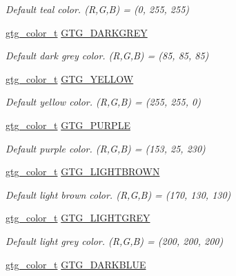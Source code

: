 \begin{DoxyCompactItemize}
\begin{DoxyCompactList}\small\item\em Default teal color. (R,G,B) = (0, 255, 255) \end{DoxyCompactList}\item 
\hyperlink{GTGColor_8h_a7d118edf2d6e2588a0323079259fb0d6}{gtg\-\_\-color\-\_\-t} \hyperlink{group__GTGColor_ga088b63848f60b294eb7717f9160ce76a}{G\-T\-G\-\_\-\-D\-A\-R\-K\-G\-R\-E\-Y}
\begin{DoxyCompactList}\small\item\em Default dark grey color. (R,G,B) = (85, 85, 85) \end{DoxyCompactList}\item 
\hyperlink{GTGColor_8h_a7d118edf2d6e2588a0323079259fb0d6}{gtg\-\_\-color\-\_\-t} \hyperlink{group__GTGColor_ga16c93cd2a5d433fcc87ef02a84799ba5}{G\-T\-G\-\_\-\-Y\-E\-L\-L\-O\-W}
\begin{DoxyCompactList}\small\item\em Default yellow color. (R,G,B) = (255, 255, 0) \end{DoxyCompactList}\item 
\hyperlink{GTGColor_8h_a7d118edf2d6e2588a0323079259fb0d6}{gtg\-\_\-color\-\_\-t} \hyperlink{group__GTGColor_gac22398d68421bab69f56bad3aec370aa}{G\-T\-G\-\_\-\-P\-U\-R\-P\-L\-E}
\begin{DoxyCompactList}\small\item\em Default purple color. (R,G,B) = (153, 25, 230) \end{DoxyCompactList}\item 
\hyperlink{GTGColor_8h_a7d118edf2d6e2588a0323079259fb0d6}{gtg\-\_\-color\-\_\-t} \hyperlink{group__GTGColor_gaf971085c762299a3ddc48983c5be7ba1}{G\-T\-G\-\_\-\-L\-I\-G\-H\-T\-B\-R\-O\-W\-N}
\begin{DoxyCompactList}\small\item\em Default light brown color. (R,G,B) = (170, 130, 130) \end{DoxyCompactList}\item 
\hyperlink{GTGColor_8h_a7d118edf2d6e2588a0323079259fb0d6}{gtg\-\_\-color\-\_\-t} \hyperlink{group__GTGColor_gaa0b434824fb73ef2aca7b3ea80b1d5fc}{G\-T\-G\-\_\-\-L\-I\-G\-H\-T\-G\-R\-E\-Y}
\begin{DoxyCompactList}\small\item\em Default light grey color. (R,G,B) = (200, 200, 200) \end{DoxyCompactList}\item 
\hyperlink{GTGColor_8h_a7d118edf2d6e2588a0323079259fb0d6}{gtg\-\_\-color\-\_\-t} \hyperlink{group__GTGColor_gafb573eac9a0e0e5b87f53381a52fb5a5}{G\-T\-G\-\_\-\-D\-A\-R\-K\-B\-L\-U\-E}

\end{DoxyCompactItemize}
